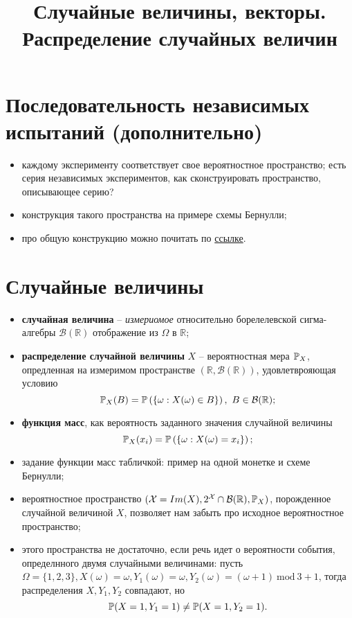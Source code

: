 

\title{Случайные величины, векторы. Распределение случайных величин}
\date{\vspace{-1cm}}


\maketitle

\section*{Последовательность независимых испытаний (дополнительно)}
\begin{itemize}
    \item
    каждому эксперименту соответствует свое вероятностное пространство; есть серия независимых экспериментов, как сконструировать пространство, описывающее серию?
    \item
    конструкция такого пространства на примере схемы Бернулли;
    \item
    про общую конструкцию можно почитать по \href{https://math.stackexchange.com/questions/4261460/how-to-define-independence-of-random-variables-from-different-probability-spaces}{ссылке}.
\end{itemize}

\section*{Случайные величины}
\begin{itemize}
    \item
    \textbf{случайная величина} -- \emph{измериомое} относительно борелелевской сигма-алгебры $\mathcal{B}(\mathbb{R})$ отображение из $\Omega$ в $\mathbb{R}$;
    \item
    \textbf{распределение случайной величины} $X$ -- вероятностная мера $\operatorname{\mathbb{P}}_X$, опредленная на измеримом пространстве $(\mathbb{R}, \mathcal{B}(\mathbb{R}))$, удовлетврояющая условию 
    \[
        \operatorname{\mathbb{P}}_X(B) = \operatorname{\mathbb{P}}\left( \left\{\omega: X(\omega) \in B\right\} \right),\ B \in \mathcal{B}(\mathbb{R});
    \]
    \item
    \textbf{функция масс}, как вероятность заданного значения случайной величины
    \[
        \operatorname{\mathbb{P}}_X(x_i) = \operatorname{\mathbb{P}}\left( \left\{\omega: X(\omega) = x_i \right\} \right);
    \]
    \item
    задание функции масс табличкой: пример на одной монетке и схеме Бернулли;
    \item 
    вероятностное пространство $(\mathcal{X} = Im(X), 2^{\mathcal{X}} \cap \mathcal{B}(\mathbb{R}), \operatorname{\mathbb{P}}_X)$, порожденное случайной величиной $X$, позволяет нам забыть про исходное вероятностное пространство;
    \item
    этого пространства не достаточно, если речь идет о вероятности события, определнного двумя случайными величинами: пусть $\Omega = \{1, 2, 3\}, X(\omega) = \omega, Y_1(\omega) = \omega, Y_2(\omega) = (\omega + 1)\ \text{mod}\ 3 + 1$, тогда распределения $X, Y_1, Y_2$ совпадают, но 
    \[
        \operatorname{\mathbb{P}}(X = 1, Y_1 = 1) \neq \operatorname{\mathbb{P}}(X = 1, Y_2 = 1).
    \]
\end{itemize}

